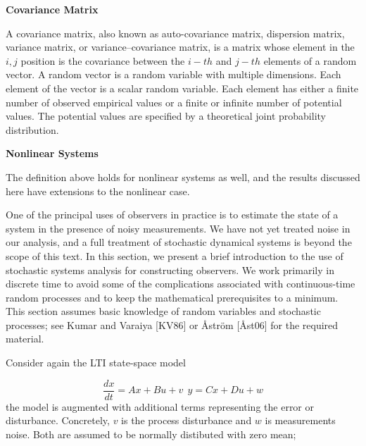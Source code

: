 \begin{framed}
\theoremstyle{remark}
\begin{remark}{\textbf{Covariance Matrix}}

A covariance matrix, also known as auto-covariance matrix, dispersion matrix, variance matrix, or variance–covariance matrix, 
is a matrix whose element in the $i, j$ position is the covariance between the $i-th$ and $j-th$ elements of a random vector. 
A random vector is a random variable with multiple dimensions. 
Each element of the vector is a scalar random variable. 
Each element has either a finite number of observed empirical values or a finite or infinite number of potential values. 
The potential values are specified by a theoretical joint probability distribution. 
\end{remark}
\end{framed}



\begin{framed}
\theoremstyle{remark}
\begin{remark}{\textbf{Nonlinear Systems}}

The definition above holds for nonlinear systems as well, and the results discussed here have extensions to the nonlinear case.
\end{remark}
\end{framed}

One of the principal uses of observers in practice is to estimate the state of a
system in the presence of noisy measurements. We have not yet treated noise in our
analysis, and a full treatment of stochastic dynamical systems is beyond the scope
of this text. In this section, we present a brief introduction to the use of stochastic
systems analysis for constructing observers. We work primarily in discrete time to
avoid some of the complications associated with continuous-time random processes
and to keep the mathematical prerequisites to a minimum. This section assumes
basic knowledge of random variables and stochastic processes; see Kumar and
Varaiya [KV86] or Åström [Åst06] for the required material.

Consider again the LTI state-space model

\begin{equation}
\frac{dx}{dt} = Ax + Bu +v  ~~ y = Cx + Du +w 
\end{equation}
the model is augmented with additional terms representing the error or disturbance. Concretely,
$v$ is the process disturbance and $w$ is measurements noise. Both are assumed to be normally distibuted with zero mean;

